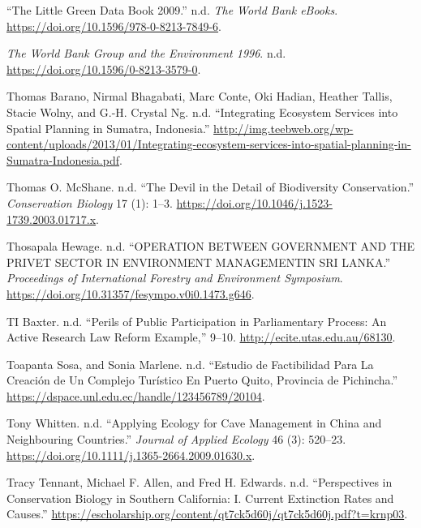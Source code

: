 \begin{CSLReferences}{1}{0}
{``The Little Green Data Book 2009.''} n.d. \emph{The World Bank
eBooks}. \url{https://doi.org/10.1596/978-0-8213-7849-6}.

\emph{The World Bank Group and the Environment 1996}. n.d.
\url{https://doi.org/10.1596/0-8213-3579-0}.

Thomas Barano, Nirmal Bhagabati, Marc Conte, Oki Hadian, Heather Tallis,
Stacie Wolny, and G.-H. Crystal Ng. n.d. {``Integrating Ecosystem
Services into Spatial Planning in Sumatra, Indonesia.''}
\url{http://img.teebweb.org/wp-content/uploads/2013/01/Integrating-ecosystem-services-into-spatial-planning-in-Sumatra-Indonesia.pdf}.

Thomas O. McShane. n.d. {``The Devil in the Detail of Biodiversity
Conservation.''} \emph{Conservation Biology} 17 (1): 1--3.
\url{https://doi.org/10.1046/j.1523-1739.2003.01717.x}.

Thosapala Hewage. n.d. {``OPERATION BETWEEN GOVERNMENT AND THE PRIVET
SECTOR IN ENVIRONMENT MANAGEMENTIN SRI LANKA.''} \emph{Proceedings of
International Forestry and Environment Symposium}.
\url{https://doi.org/10.31357/fesympo.v0i0.1473.g646}.

TI Baxter. n.d. {``Perils of Public Participation in Parliamentary
Process: An Active Research Law Reform Example,''} 9--10.
\url{http://ecite.utas.edu.au/68130}.

Toapanta Sosa, and Sonia Marlene. n.d. {``Estudio de Factibilidad Para
La Creación de Un Complejo Turístico En Puerto Quito, Provincia de
Pichincha.''} \url{https://dspace.unl.edu.ec/handle/123456789/20104}.

Tony Whitten. n.d. {``Applying Ecology for Cave Management in China and
Neighbouring Countries.''} \emph{Journal of Applied Ecology} 46 (3):
520--23. \url{https://doi.org/10.1111/j.1365-2664.2009.01630.x}.

Tracy Tennant, Michael F. Allen, and Fred H. Edwards. n.d.
{``Perspectives in Conservation Biology in Southern California: I.
Current Extinction Rates and Causes.''}
\url{https://escholarship.org/content/qt7ck5d60j/qt7ck5d60j.pdf?t=krnp03}.


\end{CSLReferences}
